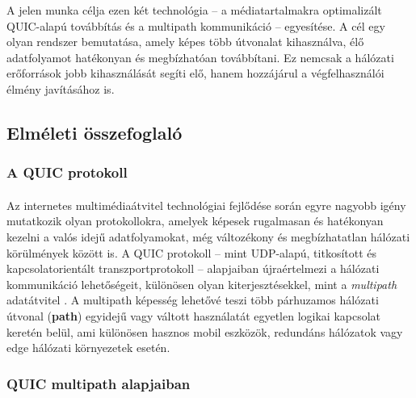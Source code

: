 \documentclass[a4paper,oneside]{article}
\begin{document}
A jelen munka célja ezen két technológia – a médiatartalmakra optimalizált QUIC-alapú 
továbbítás és a multipath kommunikáció – egyesítése. A cél egy olyan rendszer bemutatása, 
amely képes több útvonalat kihasználva, élő adatfolyamot hatékonyan és megbízhatóan 
továbbítani. Ez nemcsak a hálózati erőforrások jobb kihasználását segíti elő, hanem 
hozzájárul a végfelhasználói élmény javításához is.



\subsection{Elméleti összefoglaló}

\subsubsection{A QUIC protokoll}
\paragraph{}
Az internetes multimédiaátvitel technológiai fejlődése során egyre 
nagyobb igény mutatkozik olyan protokollokra, amelyek képesek 
rugalmasan és hatékonyan kezelni a valós idejű adatfolyamokat, még 
változékony és megbízhatatlan hálózati körülmények között is. \cite{quic} A QUIC 
protokoll – mint UDP-alapú, titkosított és kapcsolatorientált 
transzportprotokoll – alapjaiban újraértelmezi a hálózati kommunikáció 
lehetőségeit, különösen olyan kiterjesztésekkel, mint a \emph{multipath} 
adatátvitel \cite{mp_quic}. A multipath képesség lehetővé teszi több párhuzamos hálózati 
útvonal (\textbf{path}) egyidejű vagy váltott használatát egyetlen logikai kapcsolat keretén 
belül, ami különösen hasznos mobil eszközök, redundáns hálózatok vagy edge 
hálózati környezetek esetén.


\subsubsection{QUIC multipath alapjaiban}
\end{document}
